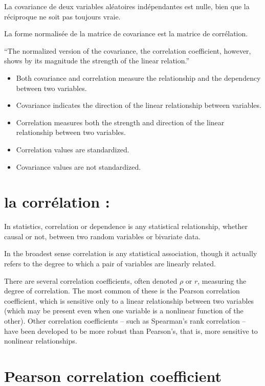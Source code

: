 \documentclass[
]{report}
\providecommand{\tightlist}{%
  \setlength{\itemsep}{0pt}\setlength{\parskip}{0pt}}
\begin{document}
La covariance de deux variables aléatoires indépendantes est nulle, bien que la réciproque ne soit pas toujours vraie.

La forme normalisée de la matrice de covariance est la matrice de corrélation.

``The normalized version of the covariance, the correlation coefficient, however, shows by its magnitude the strength of the linear relation.''

\begin{itemize}
\tightlist
\item
  Both covariance and correlation measure the relationship and the dependency between two variables.
\item
  Covariance indicates the direction of the linear relationship between variables.
\item
  Correlation measures both the strength and direction of the linear relationship between two variables.
\item
  Correlation values are standardized.
\item
  Covariance values are not standardized.
\end{itemize}

\hypertarget{la-corruxe9lation-1}{%
\section{la corrélation :}\label{la-corruxe9lation-1}}

In statistics, correlation or dependence is any statistical relationship, whether causal or not, between two random variables or bivariate data.

In the broadest sense correlation is any statistical association, though it actually refers to the degree to which a pair of variables are linearly related.

There are several correlation coefficients, often denoted \(\rho\) or \(r\), measuring the degree of correlation. The most common of these is the Pearson correlation coefficient, which is sensitive only to a linear relationship between two variables (which may be present even when one variable is a nonlinear function of the other). Other correlation coefficients -- such as Spearman's rank correlation -- have been developed to be more robust than Pearson's, that is, more sensitive to nonlinear relationships.

\hypertarget{pearson-correlation-coefficient}{%
\section{Pearson correlation coefficient}\label{pearson-correlation-coefficient}}
\end{document}
